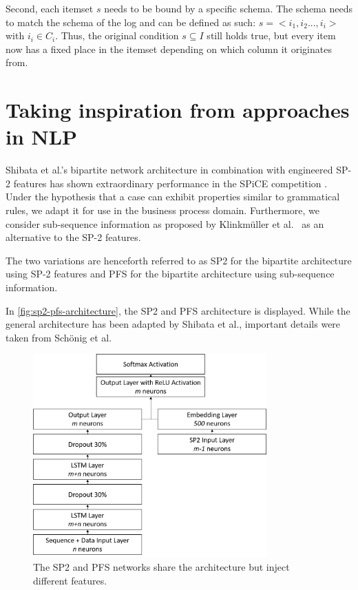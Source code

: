 Second, each itemset $s$ needs to be bound by a specific schema. The schema needs to match the schema of the log and can be defined as such: $s = <i_1, i_2 ..., i_i>$ with $i_i \in C_i$. Thus, the original condition $s \subseteq I$ still holds true, but every item now has a fixed place in the itemset depending on which column it originates from.

\section{Taking inspiration from approaches in NLP}
\label{sec:contrib:nlp-inspiration}
Shibata et al.'s bipartite network architecture in combination with engineered SP-2 features has shown extraordinary performance in the SPiCE competition \cite{web:spice}. Under the hypothesis that a case can exhibit properties similar to grammatical rules, we adapt it for use in the business process domain. Furthermore, we consider sub-sequence information as proposed by Klinkmüller et al.~\cite{klinkmuller2018reliablemonitoring} as an alternative to the SP-2 features.

The two variations are henceforth referred to as SP2 for the bipartite architecture using SP-2 features and PFS for the bipartite architecture using sub-sequence information. 

In \autoref{fig:sp2-pfs-architecture}, the SP2 and PFS architecture is displayed. While the general architecture has been adapted by Shibata et al., important details were taken from Schönig et al.

\begin{figure}[ht]
    \centering
    \includegraphics[width=0.8\textwidth]{gfx/sp2-network-architecture.png}
    \caption{The SP2 and PFS networks share the architecture but inject different features.}
    \label{fig:sp2-pfs-architecture}
\end{figure}


